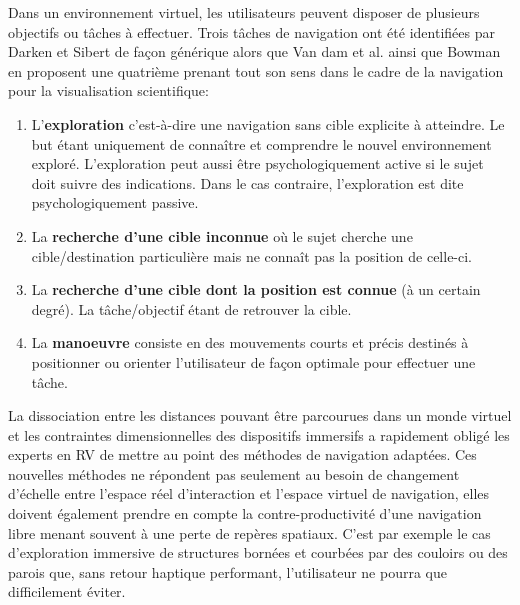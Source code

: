 Dans un environnement virtuel, les utilisateurs peuvent disposer de plusieurs objectifs ou tâches à effectuer. Trois tâches de navigation ont été identifiées par Darken et Sibert \cite{darken1996navigating} de façon générique alors que Van dam et al. \cite{van_dam_immersive_2000} ainsi que Bowman \cite{bowman_doug_a_3d_2002} en proposent une quatrième prenant tout son sens dans le cadre de la navigation pour la visualisation scientifique:

\begin{enumerate}
  \item  L'\textbf{exploration} c’est-à-dire une navigation sans cible explicite à atteindre. Le but étant uniquement de connaître et comprendre le nouvel environnement exploré. L’exploration peut aussi être psychologiquement active si le sujet doit suivre des indications. Dans le cas contraire, l’exploration est dite psychologiquement passive.
  \item La \textbf{recherche d'une cible inconnue} où le sujet cherche une cible/destination particulière mais ne connaît pas la position de celle-ci.
  \item La \textbf{recherche d'une cible dont la position est connue} (à un certain degré). La tâche/objectif étant de retrouver la cible.
  \item La \textbf{manoeuvre} consiste en des mouvements courts et précis destinés à positionner ou orienter l'utilisateur de façon optimale pour effectuer une tâche.
\end{enumerate}


La dissociation entre les distances pouvant être parcourues dans un monde virtuel et les contraintes dimensionnelles des dispositifs immersifs a rapidement obligé les experts en RV de mettre au point des méthodes de navigation adaptées. Ces nouvelles méthodes ne répondent pas seulement au besoin de changement d'échelle entre l'espace réel d'interaction et l'espace virtuel de navigation, elles doivent également prendre en compte la contre-productivité d'une navigation libre menant souvent à une perte de repères spatiaux. C'est par exemple le cas d'exploration immersive de structures bornées et courbées par des couloirs ou des parois que, sans retour haptique performant, l'utilisateur ne pourra que difficilement éviter. 


